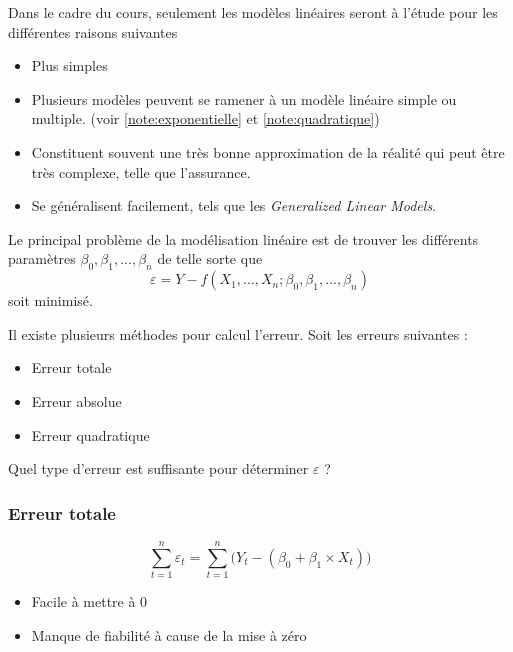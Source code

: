 \documentclass[11pt,french]{report}
\begin{document}
Dans le cadre du cours, seulement les modèles linéaires seront à l'étude pour les différentes raisons suivantes

\begin{itemize}
\item Plus simples
\item Plusieurs modèles peuvent se ramener à un modèle linéaire simple ou multiple. (voir \ref{note:exponentielle} et \ref{note:quadratique})
\item Constituent souvent une très bonne approximation de la réalité qui peut être très complexe, telle que l'assurance.
\item Se généralisent facilement, tels que les \textit{Generalized Linear Models}.
\end{itemize}

Le principal problème de la modélisation linéaire est de trouver les différents paramètres $\beta_0, \beta_1, ..., \beta_n$ de telle sorte que
\begin{equation}
\varepsilon = Y - f(X_1,...,X_n; \beta_0, \beta_1,...,\beta_n)
\end{equation}
soit minimisé.

Il existe plusieurs méthodes pour calcul l'erreur. Soit les erreurs suivantes :
\begin{itemize}
\item Erreur totale
\item Erreur absolue
\item Erreur quadratique
\end{itemize}

Quel type d'erreur est suffisante pour déterminer $\varepsilon$ ?

\subsubsection{Erreur totale}
\begin{equation}
\sum_{t=1}^n \varepsilon_t = \sum_{t=1}^n \Big( Y_t - (\beta_0 + \beta_1\times X_t) \Big) 
\end{equation}
\begin{itemize}
\item Facile à mettre à 0
\item Manque de fiabilité à cause de la mise à zéro
\end{itemize}
\end{document}
